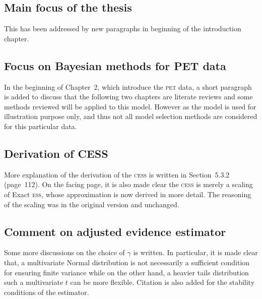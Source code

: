 \documentclass[11pt, fontset=Scala]{marticle}
\begin{document}
\subsection{Main focus of the thesis} %
\label{sub:main_focus_of_the_thesis_point_1_}

This has been addressed by new paragraphs in beginning of the introduction chapter.


\subsection{Focus on Bayesian methods for PET data} %
\label{sub:focus_on_bayesian_methods_for_pet_data}

In the beginning of Chapter~2, which introduce the \textsc{pet} data, a short paragraph is added to discuss that the following two chapters are literate reviews and some methods reviewed will be applied to this model. However as the model is used for illustration purpose only, and thus not all model selection methods are considered for this particular data.


\subsection{Derivation of CESS} %
\label{sub:derivation_of_cess}

More explanation of the derivation of the \textsc{cess} is written in Section~5.3.2 (page~112). On the facing page, it is also made clear the \textsc{cess} is merely a scaling of Exact \textsc{ess}, whose approximation is now derived in more detail. The reasoning of the scaling was in the original version and unchanged.


\subsection{Comment on adjusted evidence estimator} %
\label{sub:comment_on_adjusted_evidence_estimator}

Some more discussions on the choice of $\gamma$ is written. In particular, it is made clear that, a multivariate Normal distribution is not necessarily a sufficient condition for ensuring finite variance while on the other hand, a heavier tails distribution such a multivariate $t$ can be more flexible. Citation is also added for the stability conditions of the estimator.
\end{document}
